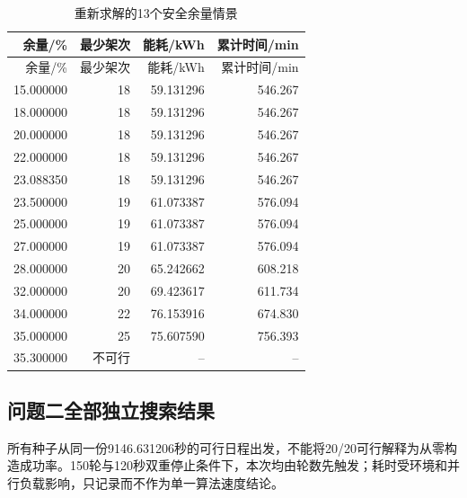 \documentclass[withoutpreface,colorprint]{format}
\numberwithin{equation}{section}
\numberwithin{figure}{section}
\numberwithin{table}{section}
\begin{document}
\begin{longtable}{@{}rrrr@{}}
\caption{重新求解的13个安全余量情景}\label{tab:app_q1_reserve}\\
\toprule
余量/\% & 最少架次 & 能耗/kWh & 累计时间/min\\
\midrule
\endfirsthead
\toprule
余量/\% & 最少架次 & 能耗/kWh & 累计时间/min\\
\midrule
\endhead
15.000000 & 18 & 59.131296 & 546.267\\
18.000000 & 18 & 59.131296 & 546.267\\
20.000000 & 18 & 59.131296 & 546.267\\
22.000000 & 18 & 59.131296 & 546.267\\
23.088350 & 18 & 59.131296 & 546.267\\
23.500000 & 19 & 61.073387 & 576.094\\
25.000000 & 19 & 61.073387 & 576.094\\
27.000000 & 19 & 61.073387 & 576.094\\
28.000000 & 20 & 65.242662 & 608.218\\
32.000000 & 20 & 69.423617 & 611.734\\
34.000000 & 22 & 76.153916 & 674.830\\
35.000000 & 25 & 75.607590 & 756.393\\
35.300000 & 不可行 & -- & --\\
\bottomrule
\end{longtable}


\subsection{问题二全部独立搜索结果}
所有种子从同一份9146.631206秒的可行日程出发，不能将20/20可行解释为从零构造成功率。150轮与120秒双重停止条件下，本次均由轮数先触发；耗时受环境和并行负载影响，只记录而不作为单一算法速度结论。
\end{document}
